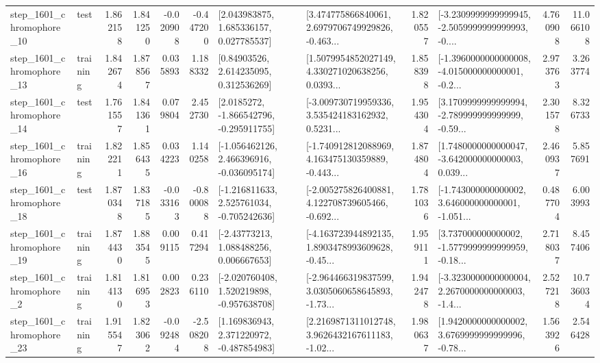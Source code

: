 \begin{tabular}{llrrrrllrlrr}
 step\_1601\_chromophore\_10 &      test &      1.862158 &    1.841250 &     -0.020908 & -0.447200 &     [2.043983875, 1.685336157, 0.027785537] &  [3.474775866840061, 2.6979706749929826, -0.463... &       1.820557 &  [-3.2309999999999945, -2.5059999999999993, -0.... &            4.760908 &         11.066108 \\
 step\_1601\_chromophore\_13 &  training &      1.842674 &    1.878567 &      0.035893 &  1.188332 &      [0.84903526, 2.614235095, 0.312536269] &  [1.5079954852027149, 4.330271020638256, 0.0393... &       1.858398 &  [-1.3960000000000008, -4.015000000000001, -0.2... &            2.973763 &          3.263774 \\
 step\_1601\_chromophore\_14 &      test &      1.761557 &    1.841361 &      0.079804 &  2.452730 &     [2.0185272, -1.866542796, -0.295911755] &  [-3.009730719959336, 3.535424183162932, 0.5231... &       1.954304 &  [3.1709999999999994, -2.789999999999999, -0.59... &            2.301578 &          8.326733 \\
 step\_1601\_chromophore\_16 &  training &      1.822211 &    1.856435 &      0.034223 &  1.140258 &   [-1.056462126, 2.466396916, -0.036095174] &  [-1.740912812088969, 4.163475130359889, -0.443... &       1.874804 &  [1.7480000000000047, -3.642000000000003, 0.039... &            2.460937 &          5.857691 \\
 step\_1601\_chromophore\_18 &      test &      1.870348 &    1.837185 &     -0.033163 & -0.800088 &   [-1.216811633, 2.525761034, -0.705242636] &  [-2.005275826400881, 4.122708739605466, -0.692... &       1.781036 &  [-1.743000000000002, 3.646000000000001, -1.051... &            0.487704 &          6.003993 \\
 step\_1601\_chromophore\_19 &  training &      1.874430 &    1.883545 &      0.009115 &  0.417294 &     [-2.43773213, 1.088488256, 0.006667653] &  [-4.163723944892135, 1.8903478993609628, -0.45... &       1.959111 &  [3.737000000000002, -1.5779999999999959, -0.18... &            2.718037 &          8.457406 \\
  step\_1601\_chromophore\_2 &  training &      1.814130 &    1.816953 &      0.002823 &  0.236110 &   [-2.020760408, 1.520219898, -0.957638708] &  [-2.964466319837599, 3.0305060658645893, -1.73... &       1.942478 &  [-3.3230000000000004, 2.2670000000000003, -1.4... &            2.527218 &         10.736034 \\
 step\_1601\_chromophore\_23 &  training &      1.915547 &    1.823062 &     -0.092484 & -2.508208 &    [1.169836943, 2.371220972, -0.487854983] &  [2.2169871311012748, 3.9626432167611183, -1.02... &       1.980637 &  [1.9420000000000002, 3.6769999999999996, -0.78... &            1.563926 &          2.546428 \\

\end{tabular}
